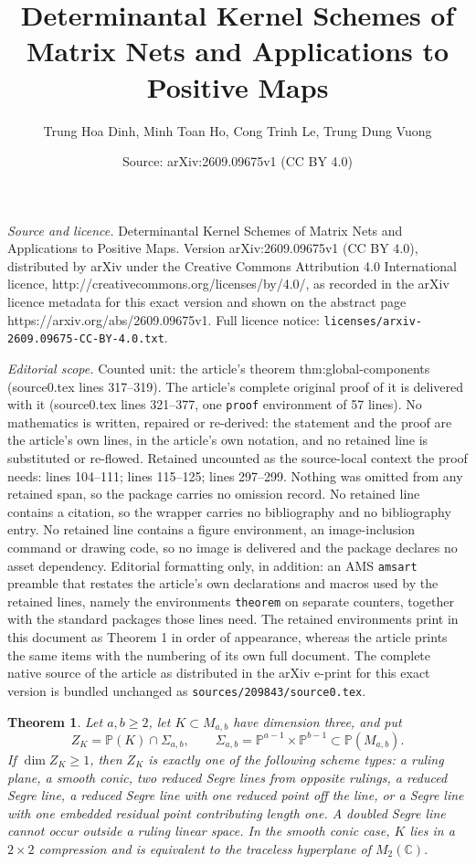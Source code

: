 \documentclass[10pt,a4paper]{amsart}
\title{Determinantal Kernel Schemes of Matrix Nets and Applications to Positive Maps}
\author{Trung Hoa Dinh, Minh Toan Ho, Cong Trinh Le, Trung Dung Vuong}
\date{Source: arXiv:2609.09675v1 (CC BY 4.0)}
\newtheorem{theorem}{Theorem}
\newcommand{\chg}[1]{#1}
\begin{document}
\maketitle

\noindent\emph{Source and licence.} Determinantal Kernel Schemes of Matrix Nets and Applications to Positive Maps. Version arXiv:2609.09675v1 (CC BY 4.0), distributed by arXiv under the Creative Commons Attribution 4.0 International licence, http://creativecommons.org/licenses/by/4.0/, as recorded in the arXiv licence metadata for this exact version and shown on the abstract page https://arxiv.org/abs/2609.09675v1. Full licence notice: \texttt{licenses/arxiv-2609.09675-CC-BY-4.0.txt}.\par\smallskip

\noindent\textit{Editorial scope.} Counted unit: the article's theorem thm:global-components (source0.tex lines 317--319). The article's complete original proof of it is delivered with it (source0.tex lines 321--377, one \texttt{proof} environment of 57 lines). No mathematics is written, repaired or re-derived: the statement and the proof are the article's own lines, in the article's own notation, and no retained line is substituted or re-flowed.  Retained uncounted as the source-local context the proof needs: lines 104--111; lines 115--125; lines 297--299.  Nothing was omitted from any retained span, so the package carries no omission record.  No retained line contains a citation, so the wrapper carries no bibliography and no bibliography entry.  No retained line contains a figure environment, an image-inclusion command or drawing code, so no image is delivered and the package declares no asset dependency.  Editorial formatting only, in addition: an AMS \texttt{amsart} preamble that restates the article's own declarations and macros used by the retained lines, namely the environments \texttt{theorem} on separate counters, together with the standard packages those lines need.  The retained environments print in this document as Theorem 1 in order of appearance, whereas the article prints the same items with the numbering of its own full document.  The complete native source of the article as distributed in the arXiv e-print for this exact version is bundled unchanged as \texttt{sources/209843/source0.tex}.
\begin{theorem}\label{thm:main-positive-dimensional}
Let $a,b\ge2$, let $K\subset M_{a,b}$ have dimension three, and put
\[
Z_K=\mathbb P(K)\cap\Sigma_{a,b},\qquad
\Sigma_{a,b}=\mathbb P^{a-1}\times\mathbb P^{b-1}\subset\mathbb P(M_{a,b}).
\]
If $\dim Z_K\ge1$, then $Z_K$ is exactly one of the following scheme types: a ruling plane, a smooth conic, two reduced Segre lines from opposite rulings, a reduced Segre line, a reduced Segre line with one reduced point off the line, or a Segre line with {one embedded residual point contributing length one}. A doubled Segre line cannot occur outside a ruling linear space. In the \chg{smooth conic} case, $K$ lies in a $2\times2$ compression and is equivalent to the traceless hyperplane of $M_2(\mathbb C)$.
\end{theorem}
\end{document}
